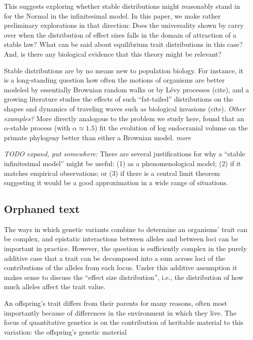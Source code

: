 \documentclass{article}
\newcommand{\comment}[1]{{\color{blue} \it #1}}
\theoremstyle{remark}
\theoremstyle{definition}
\begin{document}
This suggests exploring whether stable distributions might reasonably stand in for the Normal
in the infinitesimal model.
In this paper, we make rather preliminary explorations in that direction:
Does the universality shown by \citet{barton2017infinitesimal}
carry over when the distribution of effect sizes falls in the domain of attraction of a stable law?
What can be said about equilibrium trait distributions in this case?
And, is there any biological evidence that this theory might be relevant?

Stable distributions are by no means new to population biology.
For instance, it is a long-standing question how often the motions of organisms
are better modeled by essentially Brownian random walks or by L\'evy processes (cite),
and a growing literature studies the effects of such ``fat-tailed'' distributions
on the shapes and dynamics of traveling waves such as biological invasions (cite).
\comment{Other examples?}
More directly analogous to the problem we study here, \citet{landis2012phylogenetic}
found that an $\alpha$-stable process (with $\alpha \approx 1.5$) fit the evolution of log endocranial volume
on the primate phylogeny
better than either a Brownian model.
\comment{more}

\comment{TODO expand, put somewhere:}
There are several justifications for why a ``stable infinitesimal model'' might be useful:
(1) as a phenomenological model;
(2) if it matches empirical observations; or
(3) if there is a central limit theorem suggesting it would be a good approximation in a wide range of situations.

\subsection*{Orphaned text}
The ways in which genetic variants combine to determine an organisms' trait can be complex,
and epistatic interactions between alleles and between loci can be important in practice.
However, the question is sufficiently complex in the purely additive case
that a trait can be decomposed into a sum across loci of the contributions of the alleles from each locus.
Under this additive assumption it makes sense to discuss the ``effect size distribution'',
i.e., the distribution of how much alleles affect the trait value.

An offspring's trait differs from their parents for many reasons,
often most importantly because of differences in the environment in which they live.
The focus of quantitative genetics is on the contribution of heritable material to this variation:
the offspring's genetic material 
\end{document}
